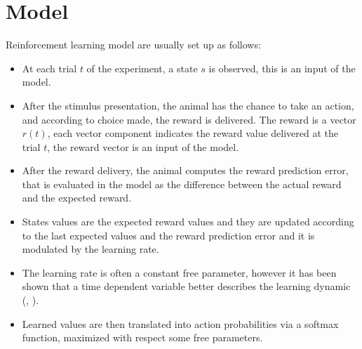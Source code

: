 \section{Model}
Reinforcement learning model are usually set up as follows:
\begin{itemize}
    \item At each trial $t$ of the experiment, a state $s$ is observed, this is an input of the model.
    \item After the stimulus presentation, the animal has the chance to take an action, and according to choice made, the reward is delivered. The reward is a vector $r(t)$, each vector component indicates the reward value delivered at the trial $t$, the reward vector is an input of the model.
    \item After the reward delivery, the animal computes the reward prediction error, that is evaluated in the model as the difference between the actual reward and the expected reward.
    \item States values are the expected reward values and they are updated according to the last expected values and the reward prediction error and it is modulated by the learning rate.
    \item The learning rate is often a constant free parameter, however it has been shown that a time dependent variable better describes the learning dynamic (\cite{Funamizu}, \cite{Daw}).
    \item Learned values are then translated into action probabilities via a softmax function, maximized with respect some free parameters.
\end{itemize}

